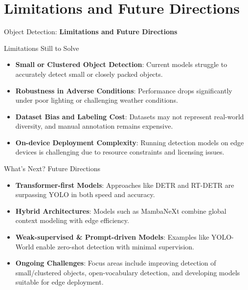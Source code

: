 \section{Limitations and Future Directions}
\begin{frame}{}
    \LARGE Object Detection: \textbf{Limitations and Future Directions}
\end{frame}

\begin{frame}{Limitations Still to Solve}
    \begin{itemize}
        \item \textbf{Small or Clustered Object Detection}: Current models struggle to accurately detect small or closely packed objects.
        \item \textbf{Robustness in Adverse Conditions}: Performance drops significantly under poor lighting or challenging weather conditions.
        \item \textbf{Dataset Bias and Labeling Cost}: Datasets may not represent real-world diversity, and manual annotation remains expensive.
        \item \textbf{On-device Deployment Complexity}: Running detection models on edge devices is challenging due to resource constraints and licensing issues.
    \end{itemize}
\end{frame}

\begin{frame}{What’s Next? Future Directions}
    \begin{itemize}
        \item \textbf{Transformer-first Models}: Approaches like DETR and RT-DETR are surpassing YOLO in both speed and accuracy.
        \item \textbf{Hybrid Architectures}: Models such as MambaNeXt combine global context modeling with edge efficiency.
        \item \textbf{Weak-supervised \& Prompt-driven Models}: Examples like YOLO-World enable zero-shot detection with minimal supervision.
        \item \textbf{Ongoing Challenges}: Focus areas include improving detection of small/clustered objects, open-vocabulary detection, and developing models suitable for edge deployment.
    \end{itemize}
\end{frame}